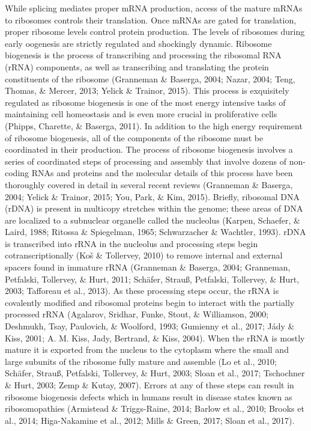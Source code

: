 \documentclass[12pt,oneside]{reedthesis}
\begin{document}
While splicing mediates proper mRNA production, access of the mature
mRNAs to ribosomes controls their translation. Once mRNAs are gated for
translation, proper ribosome levels control protein production. The
levels of ribosomes during early oogenesis are strictly regulated and
shockingly dynamic. Ribosome biogenesis is the process of transcribing
and processing the ribosomal RNA (rRNA) components, as well as
transcribing and translating the protein constituents of the ribosome
(Granneman \& Baserga, 2004; Nazar, 2004; Teng, Thomas, \& Mercer, 2013; Yelick \& Trainor, 2015). This
process is exquisitely regulated as ribosome biogenesis is one of the
most energy intensive tasks of maintaining cell homeostasis and is even
more crucial in proliferative cells (Phipps, Charette, \& Baserga, 2011). In addition to
the high energy requirement of ribosome biogenesis, all of the
components of the ribosome must be coordinated in their production. The
process of ribosome biogenesis involves a series of coordinated steps of
processing and assembly that involve dozens of non-coding RNAs and
proteins and the molecular details of this process have been thoroughly
covered in detail in several recent reviews (Granneman \& Baserga, 2004; Yelick \& Trainor, 2015; You, Park, \& Kim, 2015). Briefly, ribosomal DNA (rDNA) is present in
multicopy stretches within the genome; these areas of DNA are localized
to a subnuclear organelle called the nucleolus (Karpen, Schaefer, \& Laird, 1988; Ritossa \& Spiegelman, 1965; Schwarzacher \& Wachtler, 1993). rDNA is transcribed into rRNA in
the nucleolus and processing steps begin cotranscriptionally
(Koš \& Tollervey, 2010) to remove internal and external spacers found in immature
rRNA (Granneman \& Baserga, 2004; Granneman, Petfalski, Tollervey, \& Hurt, 2011; Schäfer, Strauß, Petfalski, Tollervey, \& Hurt, 2003; Tafforeau et al., 2013). As these processing steps occur, the rRNA is
covalently modified and ribosomal proteins begin to interact with the
partially processed rRNA (Agalarov, Sridhar, Funke, Stout, \& Williamson, 2000; Deshmukh, Tsay, Paulovich, \& Woolford, 1993; Gumienny et al., 2017; Jády \& Kiss, 2001; A. M. Kiss, Jady, Bertrand, \& Kiss, 2004). When the rRNA is mostly
mature it is exported from the nucleus to the cytoplasm where the small
and large subunits of the ribosome fully mature and assemble
(Lo et al., 2010; Schäfer, Strauß, Petfalski, Tollervey, \& Hurt, 2003; Sloan et al., 2017; Tschochner \& Hurt, 2003; Zemp \& Kutay, 2007). Errors at any of these steps can result in ribosome
biogenesis defects which in humans result in disease states known as
ribosomopathies (Armistead \& Triggs-Raine, 2014; Barlow et al., 2010; Brooks et al., 2014; Higa-Nakamine et al., 2012; Mills \& Green, 2017; Sloan et al., 2017).
\end{document}
